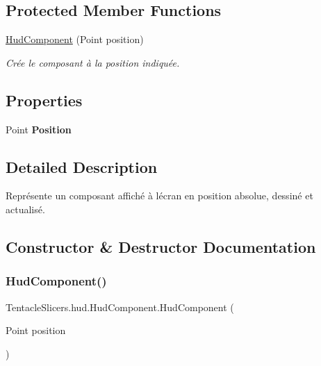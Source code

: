 \subsection*{Protected Member Functions}
\begin{DoxyCompactItemize}
\item 
\hyperlink{class_tentacle_slicers_1_1hud_1_1_hud_component_a96a46f3cdecae7ee1a82bdc3cef746de}{Hud\+Component} (Point position)
\begin{DoxyCompactList}\small\item\em Crée le composant à la position indiquée. \end{DoxyCompactList}\end{DoxyCompactItemize}
\subsection*{Properties}
\begin{DoxyCompactItemize}
\item 
\mbox{\label{class_tentacle_slicers_1_1hud_1_1_hud_component_a877e84189c664f98ac6fc682b8f9c19c}} 
Point {\bfseries Position}
\end{DoxyCompactItemize}


\subsection{Detailed Description}
Représente un composant affiché à l\textquotesingle{}écran en position absolue, dessiné et actualisé. 



\subsection{Constructor \& Destructor Documentation}
\mbox{\label{class_tentacle_slicers_1_1hud_1_1_hud_component_a96a46f3cdecae7ee1a82bdc3cef746de}} 
\subsubsection{\texorpdfstring{Hud\+Component()}{HudComponent()}}
{\footnotesize\ttfamily Tentacle\+Slicers.\+hud.\+Hud\+Component.\+Hud\+Component (\begin{DoxyParamCaption}\item[{Point}]{position }\end{DoxyParamCaption})\hspace{0.3cm}{\ttfamily [protected]}}



